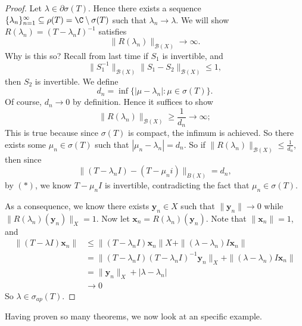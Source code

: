 \documentclass[a4paper]{article}
\begin{document}
\begin{proof}
  Let $\lambda \in \partial \sigma(T)$. Hence there exists a sequence $\{\lambda_n\}_{n = 1}^\infty \subseteq \rho(T) = \C\setminus \sigma(T)$ such that $\lambda_n \to \lambda$. We will show $R(\lambda_n) = (T - \lambda_n I)^{-1}$ satisfies
  \[
    \|R(\lambda_n)\|_{\mathcal{B}(X)} \to \infty.
  \]
  Why is this so? Recall from last time if $S_1$ is invertible, and
  \[
    \|S_1^{-1}\|_{\mathcal{B}(X)} \|S_1 - S_2\|_{\mathcal{B}(X)} \leq 1, \tag{$*$}
  \]
  then $S_2$ is invertible. We define
  \[
    d_n = \inf\{ |\mu - \lambda_n|: \mu \in \sigma(T)\}.
  \]
  Of course, $d_n \to 0$ by definition. Hence it suffices to show
  \[
    \|R(\lambda_n)\|_{\mathcal{B}(X)} \geq \frac{1}{d_n} \to \infty;
  \]
  This is true because since $\sigma(T)$ is compact, the infimum is achieved. So there exists some $\mu_n \in \sigma(T)$ such that $|\mu_n - \lambda_n| = d_n$. So if $\|R(\lambda_n)\|_{\mathcal{B}(X)} \leq \frac{1}{d_n}$, then since
  \[
    \|(T - \lambda_n I) - (T - \mu_n i)\|_{B(X)} = d_n,
  \]
  by $(*)$, we know $T - \mu_n I$ is invertible, contradicting the fact that $\mu_n \in \sigma(T)$.

  As a consequence, we know there exists $\mathbf{y}_n \in X$ such that $\|\mathbf{y}_n\| \to 0$ while $\|R(\lambda_n)(\mathbf{y}_n)\|_X = 1$. Now let $\mathbf{x}_n = R(\lambda_n) (\mathbf{y}_n)$. Note that $\|\mathbf{x}_n\| = 1$, and
  \begin{align*}
    \|(T - \lambda I)\mathbf{x}_n \| &\leq \|(T - \lambda_n I) \mathbf{x}_n\|X + \|(\lambda - \lambda_n) I \mathbf{x}_n\|\\
    &= \|(T - \lambda_n I) (T - \lambda_n I)^{-1} \mathbf{y}_n\|_X + \|(\lambda - \lambda_n) I \mathbf{x}_n\|\\
    &= \|\mathbf{y}_n\|_X + |\lambda - \lambda_n|\\
    &\to 0
  \end{align*}
  So $\lambda \in \sigma_{ap}(T)$.
\end{proof}

Having proven so many theorems, we now look at an specific example.
\end{document}
